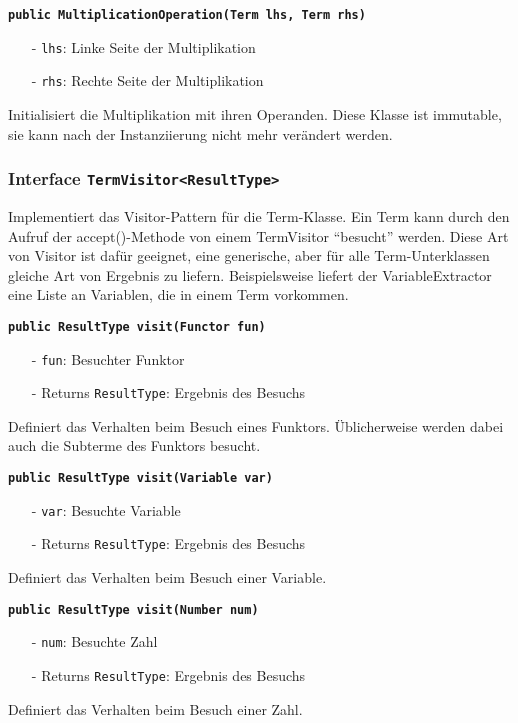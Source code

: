 \documentclass[parskip=full,11pt,twoside]{scrartcl}
\begin{document}
\textbf{\texttt{public MultiplicationOperation(Term lhs, Term rhs)}}
\begin{itemize}[noitemsep]
	\item[-] \texttt{lhs}: Linke Seite der Multiplikation
	\item[-] \texttt{rhs}: Rechte Seite der Multiplikation
\end{itemize}
Initialisiert die Multiplikation mit ihren Operanden. Diese Klasse ist immutable, sie kann nach der Instanziierung nicht mehr verändert werden.
\subsubsection{Interface \texttt{TermVisitor<ResultType>}}
Implementiert das Visitor-Pattern für die Term-Klasse. Ein Term kann durch den Aufruf der accept()-Methode von einem TermVisitor \enquote{besucht} werden. Diese Art von Visitor ist dafür geeignet, eine generische, aber für alle Term-Unterklassen gleiche Art von Ergebnis zu liefern. Beispielsweise liefert der VariableExtractor eine Liste an Variablen, die in einem Term vorkommen.

\textbf{\texttt{public ResultType visit(Functor fun)}}
\begin{itemize}[noitemsep]
	\item[-] \texttt{fun}: Besuchter Funktor
	\item[-] Returns \texttt{ResultType}: Ergebnis des Besuchs
\end{itemize}
Definiert das Verhalten beim Besuch eines Funktors. Üblicherweise werden dabei auch die Subterme des Funktors besucht.

\textbf{\texttt{public ResultType visit(Variable var)}}
\begin{itemize}[noitemsep]
	\item[-] \texttt{var}: Besuchte Variable
	\item[-] Returns \texttt{ResultType}: Ergebnis des Besuchs
\end{itemize}
Definiert das Verhalten beim Besuch einer Variable.

\textbf{\texttt{public ResultType visit(Number num)}}
\begin{itemize}[noitemsep]
	\item[-] \texttt{num}: Besuchte Zahl
	\item[-] Returns \texttt{ResultType}: Ergebnis des Besuchs
\end{itemize}
Definiert das Verhalten beim Besuch einer Zahl.
\end{document}
